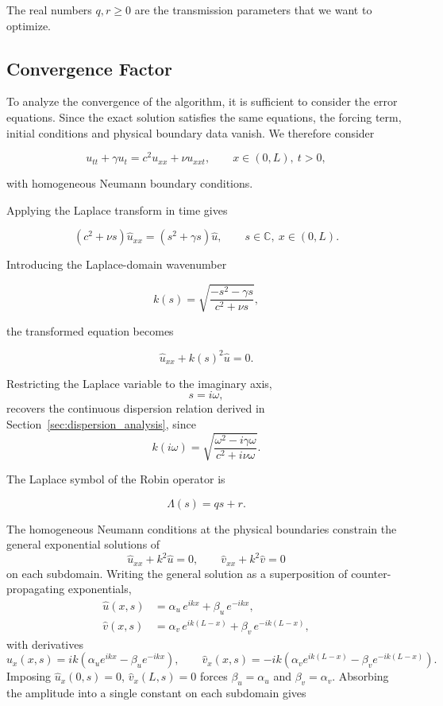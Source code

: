 \documentclass{Configuration_Files/PoliMi3i_thesis}
\begin{document}
The real numbers $q,r\ge0$ are the transmission parameters that we want to optimize.

\subsection{Convergence Factor}

To analyze the convergence of the algorithm, it is sufficient to consider the error equations. Since the exact solution satisfies the same equations, the forcing term, initial conditions and physical boundary data vanish. We therefore consider

\begin{equation*}
u_{tt}
+\gamma u_t
=
c^2u_{xx}
+\nu u_{xxt}, \qquad x \in (0,L), \ t > 0,
\end{equation*}

with homogeneous Neumann boundary conditions.

Applying the Laplace transform in time gives

\begin{equation*}
(c^2+\nu s)\widehat{u}_{xx}
=
(s^2+\gamma s)\widehat{u}, \qquad s \in \mathbb{C}, \ x \in (0,L).
\end{equation*}

Introducing the Laplace-domain wavenumber

\begin{equation*}
k(s)
=
\sqrt{
\frac{-s^2-\gamma s}
     {c^2+\nu s}
},
\end{equation*}

the transformed equation becomes

\begin{equation*}
\widehat{u}_{xx}
+
k(s)^2
\widehat{u}
=
0.
\end{equation*}

Restricting the Laplace variable to the imaginary axis,
\[
s=i\omega,
\]
recovers the continuous dispersion relation derived in
Section~\ref{sec:dispersion_analysis}, since
\[
k(i\omega)
=
\sqrt{
\frac{\omega^2-i\gamma\omega}
     {c^2+i\nu\omega}
}.
\]

The Laplace symbol of the Robin operator is

\begin{equation*}
\Lambda(s)=qs+r.
\end{equation*}

The homogeneous Neumann conditions at the physical boundaries constrain the general exponential solutions of
\[
\widehat{u}_{xx}+k^2\widehat{u}=0,
\qquad
\widehat{v}_{xx}+k^2\widehat{v}=0
\]
on each subdomain. Writing the general solution as a superposition of counter-propagating exponentials,
\begin{align*}
\widehat{u}(x,s) &= \alpha_u\,e^{ikx} + \beta_u\,e^{-ikx}, \\
\widehat{v}(x,s) &= \alpha_v\,e^{ik(L-x)} + \beta_v\,e^{-ik(L-x)},
\end{align*}
with derivatives
\[
\widehat{u}_x(x,s) = ik\left(\alpha_u e^{ikx}-\beta_u e^{-ikx}\right),
\qquad
\widehat{v}_x(x,s) = -ik\left(\alpha_v e^{ik(L-x)}-\beta_v e^{-ik(L-x)}\right).
\]
Imposing $\widehat u_x(0,s)=0$, $\widehat v_x(L,s)=0$ forces $\beta_u=\alpha_u$ and $\beta_v=\alpha_v$. Absorbing the amplitude into a single constant on each subdomain gives
\end{document}
